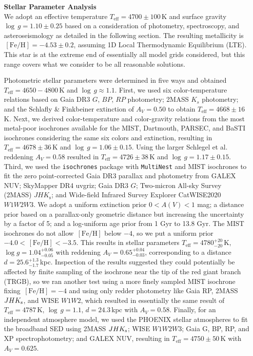 \documentclass{natureprintstyle}
\newcommand{\code}[1]{\texttt{#1}\xspace}
\newcommand{\unit}[1]{\ensuremath{\mathrm{\,#1}}\xspace}
\newcommand{\feh}{\unit{[Fe/H]}}
\newcommand{\teff}{\ensuremath{T_\mathrm{eff}}\xspace}
\newcommand{\Teff}{\teff}
\newcommand{\logg}{\ensuremath{\log\,g}\xspace}
\begin{document}
\vspace{1mm}
\noindent
{\bf Stellar Parameter Analysis}
\\
\noindent
We adopt an effective temperature $\Teff = 4700 \pm 100$\,K and surface gravity $\logg = 1.10 \pm 0.25$ based on a consideration of photometry, spectroscopy, and asteroseismology as detailed in the following section.
The resulting metallicity is $\feh = -4.53 \pm 0.2$, assuming 1D Local Thermodynamic Equilibrium (LTE).
This star is at the extreme end of essentially all model grids considered, but this range covers what we consider to be all reasonable solutions.

Photometric stellar parameters were determined in five ways and obtained $\Teff = 4650-4800$\,K and $\logg \approx 1.1$.
First, we used six color-temperature relations\cite{Mucciarelli2021} based on Gaia DR3 $G$, $BP$, $RP$ photometry; 2MASS $K_s$ photometry; and the Schlafly \& Finkbeiner\cite{Schlafly2011} extinction of $A_V = 0.50$ to obtain $\Teff = 4668 \pm 16$\,K.
Next, we derived color-temperature and color-gravity relations from the most metal-poor isochrones available for the MIST, Dartmouth, PARSEC, and BaSTI isochrones considering the same six colors and extinction, resulting in $\Teff = 4678 \pm 36$\,K and $\logg = 1.06 \pm 0.15$. Using the larger Schlegel et al.\cite{Schlegel1998} reddening $A_V = 0.58$ resulted in $\Teff = 4726 \pm 38$\,K and $\logg=1.17\pm0.15$.
Third, we used the \code{isochrones} package\cite{mor15} with \code{MultiNest}{\cite{fer08}} and MIST isochrones\cite{Choi2016} to fit the
zero point-corrected Gaia DR3 parallax\cite{gai21,fab21,lin21a,lin21b,row21,tor21} and photometry from
GALEX NUV\cite{bia17};
SkyMapper DR4 uvgriz\cite{onk24}; 
Gaia DR3 $G$\cite{gai16,gai21,fab21,rie21,row21,tor21};
Two-micron All-sky Survey (2MASS) $JHK_{\text{s}}$\cite{skr06};
and Wide-field Infrared Survey Explorer CatWISE2020 $W1W2W3$\cite{wri10,mai11,eis20,mar21}.
We adopt a uniform extinction prior $0 < A(V) < 1$ mag; a distance prior based on a parallax-only geometric distance\cite{bai21} but increasing the uncertainty by a factor of 5; and a log-uniform age prior from 1 Gyr to 13.8 Gyr.
The MIST isochrones do not allow \feh below $-4$, so we put a uniform prior $-4.0 < \feh < -3.5$.
This results in stellar parameters $\Teff = 4780_{-20}^{+20}$\,K, $\log g = 1.04_{-0.05}^{+0.06}$ with reddening $A_V = 0.65^{+0.04}_{-0.03}$, corresponding to a distance $d = 25.6_{-1.7}^{+1.3}$\,kpc.
Inspection of the results suggested they could potentially be affected by finite sampling of the isochrone near the tip of the red giant branch (TRGB), so we ran another test using a more finely sampled MIST isochrone fixing $\feh=-4$ and using only redder photometry like Gaia RP, 2MASS $JHK_{\rm s}$, and WISE $W1W2$, which resulted in essentially the same result of $\Teff=4787$\,K, $\logg=1.1$, $d=24.3$\,kpc with $A_V=0.58$.
Finally, for an independent atmosphere model, we used the PHOENIX stellar atmospheres\cite{Husser2013} to fit the broadband SED using 2MASS $JHK_{\rm s}$; WISE $W1W2W3$; Gaia G, BP, RP, and XP spectrophotometry; and GALEX NUV, resulting in $\Teff = 4750 \pm 50$\,K with $A_V = 0.625$\cite{Stassun2017,Stassun2018}.
\end{document}
